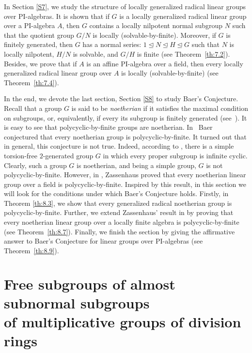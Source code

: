 \documentclass{amsart}
\theoremstyle{definition}
\begin{document}
In Section \ref{S7}, we study the structure of locally generalized radical linear groups over $\mathrm{PI}$-algebras. It is shown that if $G$ is a locally generalized radical linear group over a $\mathrm{PI}$-algebra $A$, then $G$ contains a locally nilpotent normal subgroup $N$ such that the quotient group $G/N$ is locally (solvable-by-finite). Moreover, if $G$ is finitely generated, then $G$ has a normal series: $1\trianglelefteq N\trianglelefteq H\trianglelefteq G$ such that $N$ is locally nilpotent, $H/N$ is solvable, and $G/H$ is finite (see Theorem~\ref{th:7.2}). Besides, we prove that if $A$ is an affine $\mathrm{PI}$-algebra over a field, then every locally generalized radical linear group over $A$ is locally (solvable-by-finite) (see Theorem~\ref{th:7.4}).

In the end, we devote the last section, Section \ref{S8} to study Baer's Conjecture.
Recall that a group $G$ is said to be \textit{noetherian} if it satisfies the maximal condition on subgroups, or, equivalently, if every its subgroup is finitely generated (see~\cite{Zassenhaus_1969}). It is easy to see that polycyclic-by-finite groups are noetherian. In~\cite{Pa_Baer_1956} Baer conjectured that every noetherian group is polycyclic-by-finite. It turned out that in general, this conjecture is not true. Indeed, according to \cite[Theorem 28.3]{Bo_Ol'shanskii_1991}, there is a simple torsion-free $2$-generated group $G$ in which every proper subgroup is infinite cyclic. Clearly, such a group $G$ is noetherian, and  being a simple group, $G$ is not polycyclic-by-finite. However, 
in \cite[Theorem 1]{Zassenhaus_1969}, Zassenhaus proved that every noetherian linear group over a field is polycyclic-by-finite. Inspired by this result, in this section we will look for the conditions under which Baer's Conjecture holds. Firstly, in Theorem \ref{th:8.3}, we show that every generalized radical noetherian group is polycyclic-by-finite. Further, we extend Zassenhaus' result in \cite[Theorem 1]{Zassenhaus_1969} by proving that every noetherian linear group over a locally finite algebra is polycyclic-by-finite (see Theorem~\ref{th:8.7}). Finally, we finish the section by giving the affirmative answer to Baer's Conjecture for linear groups over $\mathrm{PI}$-algebras (see Theorem~\ref{th:8.9}).

\section{Free subgroups of almost subnormal subgroups \\ of multiplicative groups of  division rings}\label{generalized}
\end{document}
